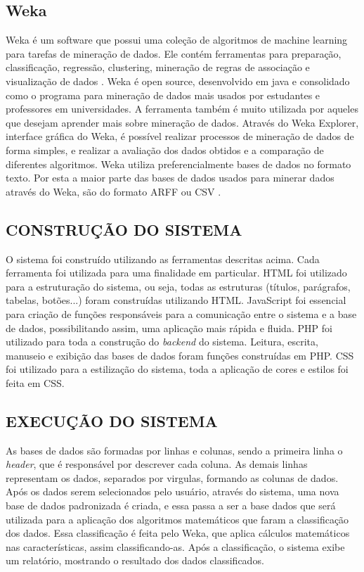 \subsection{Weka}
Weka é um software que possui uma coleção de algoritmos de machine learning para tarefas de mineração de dados. Ele contém ferramentas para preparação, classificação, regressão, clustering, mineração de regras de associação e visualização de dados \cite{Weka}.
Weka é open source, desenvolvido em java e consolidado como o programa para mineração de dados mais usados por estudantes e professores em universidades. A ferramenta também é muito utilizada por aqueles que desejam aprender mais sobre mineração de dados. Através do Weka Explorer, interface gráfica do Weka, é possível realizar processos de mineração de dados de forma simples, e realizar a avaliação dos dados obtidos e a comparação de diferentes algoritmos. 
Weka utiliza preferencialmente bases de dados no formato texto. Por esta a maior parte das bases de dados usados para minerar dados através do Weka, são do formato ARFF ou CSV \cite{Goncalves2012}.

\subsection{CONSTRUÇÃO DO SISTEMA}
O sistema foi construído utilizando as ferramentas descritas acima. Cada ferramenta foi utilizada para uma finalidade em particular. HTML foi utilizado para a estruturação do sistema, ou seja, todas as estruturas (títulos, parágrafos, tabelas, botões...) foram construídas utilizando HTML. JavaScript foi essencial para criação de funções responsáveis para a comunicação entre o sistema e a base de dados, possibilitando assim, uma aplicação mais rápida e fluida. PHP foi utilizado para toda a construção do \textit{backend} do sistema. Leitura, escrita, manuseio e exibição das bases de dados foram funções construídas em PHP. CSS foi utilizado para a estilização do sistema, toda a aplicação de cores e estilos foi feita em CSS.

\subsection{EXECUÇÃO DO SISTEMA}
As bases de dados são formadas por linhas e colunas, sendo a primeira linha o \textit{header}, que é responsável por descrever cada coluna. As demais linhas representam os dados, separados por virgulas, formando as colunas de dados. Após os dados serem selecionados pelo usuário, através do sistema, uma nova base de dados padronizada é criada, e essa passa a ser a base dados que será utilizada para a aplicação dos algoritmos matemáticos que faram a classificação dos dados. Essa classificação é feita pelo Weka, que aplica cálculos matemáticos nas características, assim classificando-as. Após a classificação, o sistema exibe um relatório, mostrando o resultado dos dados classificados.